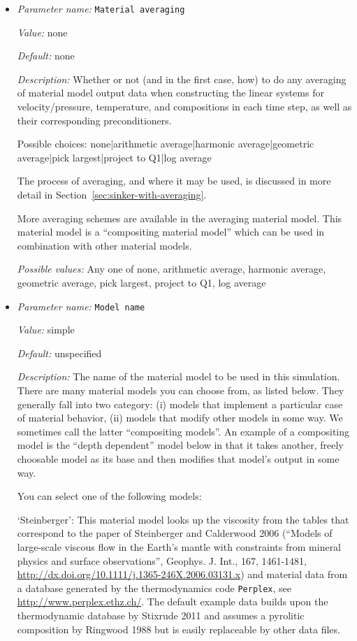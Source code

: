 \begin{itemize}
\item {\it Parameter name:} {\tt Material averaging}
\label{parameters:Material model/Material averaging}


{\it Value:} none


{\it Default:} none


{\it Description:} Whether or not (and in the first case, how) to do any averaging of material model output data when constructing the linear systems for velocity/pressure, temperature, and compositions in each time step, as well as their corresponding preconditioners.

Possible choices: none|arithmetic average|harmonic average|geometric average|pick largest|project to Q1|log average

The process of averaging, and where it may be used, is discussed in more detail in Section~\ref{sec:sinker-with-averaging}.

More averaging schemes are available in the averaging material model. This material model is a ``compositing material model'' which can be used in combination with other material models.


{\it Possible values:} Any one of none, arithmetic average, harmonic average, geometric average, pick largest, project to Q1, log average
\item {\it Parameter name:} {\tt Model name}
\label{parameters:Material model/Model name}


{\it Value:} simple


{\it Default:} unspecified


{\it Description:} The name of the material model to be used in this simulation. There are many material models you can choose from, as listed below. They generally fall into two category: (i) models that implement a particular case of material behavior, (ii) models that modify other models in some way. We sometimes call the latter ``compositing models''. An example of a compositing model is the ``depth dependent'' model below in that it takes another, freely choosable model as its base and then modifies that model's output in some way.

You can select one of the following models:

`Steinberger': This material model looks up the viscosity from the tables that correspond to the paper of Steinberger and Calderwood 2006 (``Models of large-scale viscous flow in the Earth's mantle with constraints from mineral physics and surface observations'', Geophys. J. Int., 167, 1461-1481, \url{http://dx.doi.org/10.1111/j.1365-246X.2006.03131.x}) and material data from a database generated by the thermodynamics code \texttt{Perplex}, see \url{http://www.perplex.ethz.ch/}. The default example data builds upon the thermodynamic database by Stixrude 2011 and assumes a pyrolitic composition by Ringwood 1988 but is easily replaceable by other data files. 


\end{itemize}
